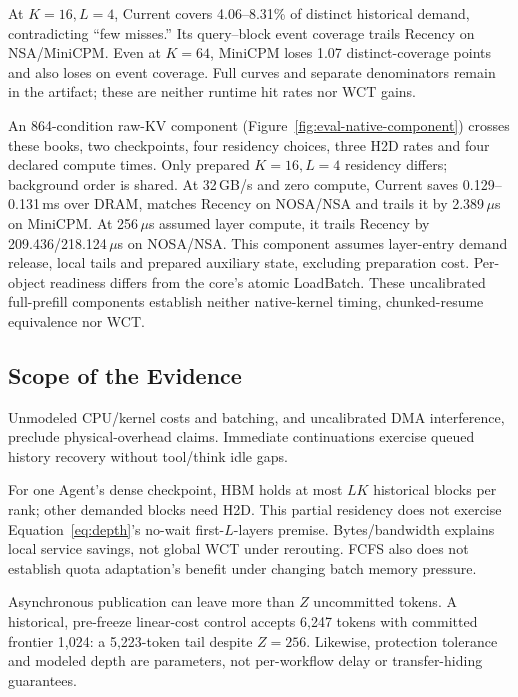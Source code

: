 At $K=16,L=4$, Current covers 4.06--8.31\% of distinct historical demand,
contradicting ``few misses.'' Its query--block event coverage trails Recency
on NSA/MiniCPM. Even at $K=64$, MiniCPM loses 1.07 distinct-coverage points
and also loses on event coverage. Full curves and separate denominators remain
in the artifact; these are neither runtime hit rates nor WCT gains.

An 864-condition raw-KV component (Figure~\ref{fig:eval-native-component})
crosses these books, two checkpoints, four residency choices, three H2D rates
and four declared compute times. Only prepared $K=16,L=4$ residency differs;
background order is shared. At 32\,GB/s and zero compute, Current saves
0.129--0.131\,ms over DRAM, matches Recency on NOSA/NSA and
trails it by 2.389\,$\mu$s on MiniCPM. At 256\,$\mu$s assumed layer compute,
it trails Recency by 209.436/218.124\,$\mu$s on NOSA/NSA.
This component assumes layer-entry demand release, local tails and prepared
auxiliary state, excluding preparation cost. Per-object readiness differs
from the core's atomic LoadBatch. These uncalibrated full-prefill components
establish neither native-kernel timing, chunked-resume equivalence nor WCT.

\subsection{Scope of the Evidence}
\label{sec:eval-limits}
Unmodeled CPU/kernel costs and batching, and uncalibrated DMA interference,
preclude physical-overhead claims. Immediate continuations exercise queued
history recovery without tool/think idle gaps.

For one Agent's dense checkpoint, HBM holds at most $LK$ historical blocks per
rank; other demanded blocks need H2D. This partial residency does not exercise
Equation~\ref{eq:depth}'s no-wait first-$L$-layers premise. Bytes/bandwidth
explains local service savings, not global WCT under rerouting. FCFS also
does not establish quota adaptation's benefit under changing batch memory pressure.

Asynchronous publication can leave more than $Z$ uncommitted tokens.
A historical, pre-freeze linear-cost control accepts 6,247 tokens with
committed frontier 1,024: a 5,223-token tail despite $Z=256$.
Likewise, protection tolerance and modeled depth are parameters, not
per-workflow delay or transfer-hiding guarantees.
